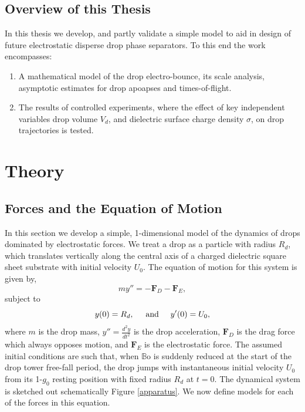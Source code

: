 \documentclass[12pt,a4paper,oneside]{book}
\begin{document}
\section{Overview of this Thesis}
In this thesis we develop, and partly validate a simple model to aid in design of future electrostatic disperse drop phase separators. To this end the work encompasses:
\begin{enumerate}
\item A mathematical model of the drop electro-bounce, its scale analysis, asymptotic estimates for drop apoapses and times-of-flight.
\item The results of controlled experiments, where the effect of key independent variables drop volume $V_d$, and dielectric surface charge density $\sigma$, on drop trajectories is tested. 
\end{enumerate}

\chapter{Theory}
\section{Forces and the Equation of Motion}
In this section we develop a simple, 1-dimensional model of the dynamics of drops dominated by electrostatic forces. We treat a drop as a particle with radius $R_d$, which translates vertically along the central axis of a charged dielectric square sheet substrate with initial velocity $U_0$. The equation of motion for this system is given by,
\begin{equation}
m y'' = - \mathbf{F}_D - \mathbf{F}_E,
\label{gov_eqn}
\end{equation}
subject to
\begin{equation}
y(0) = R_d, \hspace{5 mm} \mbox{and} \hspace{5 mm} y'(0) = U_0,
\end{equation}
where $m$ is the drop mass, $y'' = \frac{d^2 y}{d t^2}$ is the drop acceleration, $\mathbf{F}_D$ is the drag force which always opposes motion, and $\mathbf{F}_E$ is the electrostatic force. The assumed initial conditions are such that, when $\mathbb{B}\mbox{o}$ is suddenly reduced at the start of the drop tower free-fall period, the drop jumps with instantaneous initial velocity $U_0$ from its 1-$g_0$ resting position with fixed radius $R_d$ at $t=0$. The dynamical system is sketched out schematically Figure \ref{apparatus}. We now define models for each of the forces in this equation.
\end{document}
